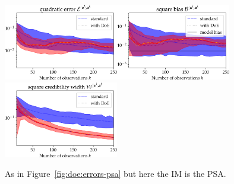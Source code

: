     \begin{figure}[h]
        \centering
        \hspace*{-1cm}%
        \includegraphics[width=5cm]{figures/DoE/errE_PGA.pdf}\includegraphics[width=5cm]{figures/DoE/errB_PGA.pdf}\includegraphics[width=5cm]{figures/DoE/errW_PGA.pdf}%
        \caption{As in Figure~\ref{fig:doe:errors-psa} but here the IM  is the PSA.}
        \label{fig:doe:errors-pga}
    \end{figure}





